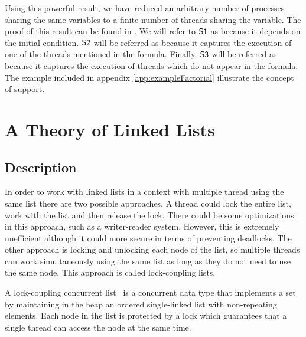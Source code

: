 Using this powerful result, we have reduced an arbitrary number of processes sharing the same variables to a finite number of threads sharing the variable. 
%
The proof of this result can be found in .
%
We will refer to $\mathsf{S1}$ as  because it depends on the initial condition.
%
$\mathsf{S2}$ will be referred as  because it captures the execution of one of the threads mentioned in the formula.
%
Finally, $\mathsf{S3}$ will be referred as  because it captures the execution of threads which do not appear in the formula. 
%
The example included in appendix \ref{app:exampleFactorial} illustrate the concept of support. 



\section{A Theory of Linked Lists}

\subsection{Description}

In order to work with linked lists in a context with multiple thread using the same list 
there are two possible approaches. 
%
A thread could lock the entire list, work with the list and then release the lock. 
%
There could be some optimizations in this approach, such as a writer-reader system.
%
However, this is extremely unefficient although it could more secure in terms of preventing deadlocks.
%
The other approach is locking and unlocking each node of the list, so multiple threads can work simultaneously using the same list as long as they do not need to use the same node.
%
This approach is called lock-coupling lists.



\begin{defn}
A lock-coupling concurrent list~\cite{herlihy08art,vafeiadis06proving} is 
a concurrent data type that implements a set by maintaining in the heap an 
ordered single-linked list with non-repeating elements.
%
Each node in the list is protected by a lock which guarantees that a 
single thread can access the node at the same time.
%
\end{defn}

